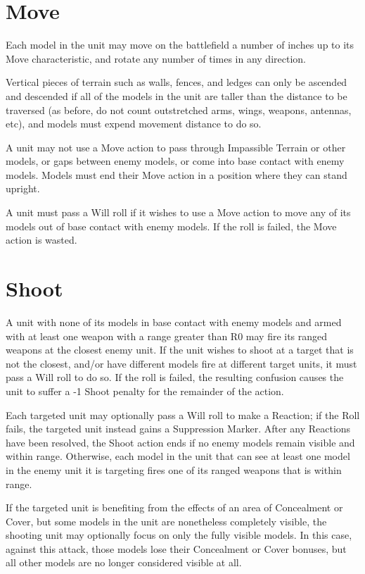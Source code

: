 \begin{multicols}{2}
\section*{Move}
Each model in the unit may move on the battlefield a number of inches up to its Move characteristic, and rotate any number of times in any direction.

Vertical pieces of terrain such as walls, fences, and ledges can only be ascended and descended if all of the models in the unit are taller than the distance to be traversed (as before, do not count outstretched arms, wings, weapons, antennas, etc), and models must expend movement distance to do so.

A unit may not use a Move action to pass through Impassible Terrain or other models, or gaps between enemy models, or come into base contact with enemy models. Models must end their Move action in a position where they can stand upright. 

A unit must pass a Will roll if it wishes to use a Move action to move any of its models out of base contact with enemy models. If the roll is failed, the Move action is wasted.




\section*{Shoot}
A unit with none of its models in base contact with enemy models and armed with at least one weapon with a range greater than R0 may fire its ranged weapons at the closest enemy unit. If the unit wishes to shoot at a target that is not the closest, and/or have different models fire at different target units, it must pass a Will roll to do so. If the roll is failed, the resulting confusion causes the unit to suffer a -1 Shoot penalty for the remainder of the action.

Each targeted unit may optionally pass a Will roll to make a Reaction; if the Roll fails, the targeted unit instead gains a Suppression Marker. After any Reactions have been resolved, the Shoot action ends if no enemy models remain visible and within range. Otherwise, each model in the unit that can see at least one model in the enemy unit it is targeting fires one of its ranged weapons that is within range.

If the targeted unit is benefiting from the effects of an area of Concealment or Cover, but some models in the unit are nonetheless completely visible, the shooting unit may optionally focus on only the fully visible models. In this case, against this attack, those models lose their Concealment or Cover bonuses, but all other models are no longer considered visible at all.


\end{multicols}
